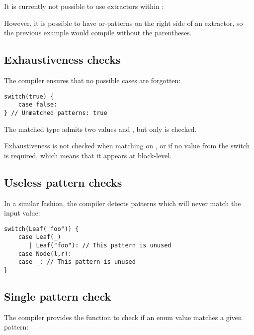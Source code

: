 It is currently not possible to use extractors within :


However, it is possible to have or-patterns on the right side of an extractor, so the previous example would compile without the parentheses.


\subsection{Exhaustiveness checks}
\label{lf-pattern-matching-exhaustiveness}

The compiler ensures that no possible cases are forgotten:

\begin{lstlisting}
switch(true) {
    case false:
} // Unmatched patterns: true
\end{lstlisting}

The matched type  admits two values  and , but only  is checked.

Exhaustiveness is not checked when matching on ,  or  if no value from the switch is required, which means that it appears at block-level.




\subsection{Useless pattern checks}
\label{lf-pattern-matching-unused}

In a similar fashion, the compiler detects patterns which will never match the input value:

\begin{lstlisting}
switch(Leaf("foo")) {
    case Leaf(_)
       | Leaf("foo"): // This pattern is unused
    case Node(l,r):
    case _: // This pattern is unused
}
\end{lstlisting}



\subsection{Single pattern check}
\label{lf-pattern-matching-single}

The compiler provides the function  to check if an enum value matches a given pattern:


